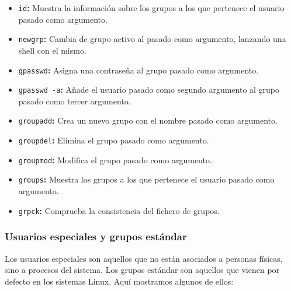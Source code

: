 \begin{itemize}
	\item\texttt{id}\textbf{:} Muestra la información sobre los grupos a los que pertenece el usuario pasado como argumento.
	\item\texttt{newgrp}\textbf{:} Cambia de grupo activo al pasado como argumento, lanzando una shell con el mismo.
	\item\texttt{gpasswd}\textbf{:} Asigna una contraseña al grupo pasado como argumento.
	\item\texttt{gpasswd -a}\textbf{:} Añade el usuario pasado como segundo argumento al grupo pasado como tercer argumento.
	\item\texttt{groupadd}\textbf{:} Crea un nuevo grupo con el nombre pasado como argumento.
	\item\texttt{groupdel}\textbf{:} Elimina el grupo pasado como argumento.
	\item\texttt{groupmod}\textbf{:} Modifica el grupo pasado como argumento.
	\item\texttt{groups}\textbf{:} Muestra los grupos a los que pertenece el usuario pasado como argumento.
	\item\texttt{grpck}\textbf{:} Comprueba la consistencia del fichero de grupos.
\end{itemize}

\subsubsection{Usuarios especiales y grupos estándar}

Los usuarios especiales son aquellos que no están asociados a personas físicas, sino a procesos del sistema.
Los grupos estándar son aquellos que vienen por defecto en los sistemas Linux.
Aquí mostramos algunos de ellos:

